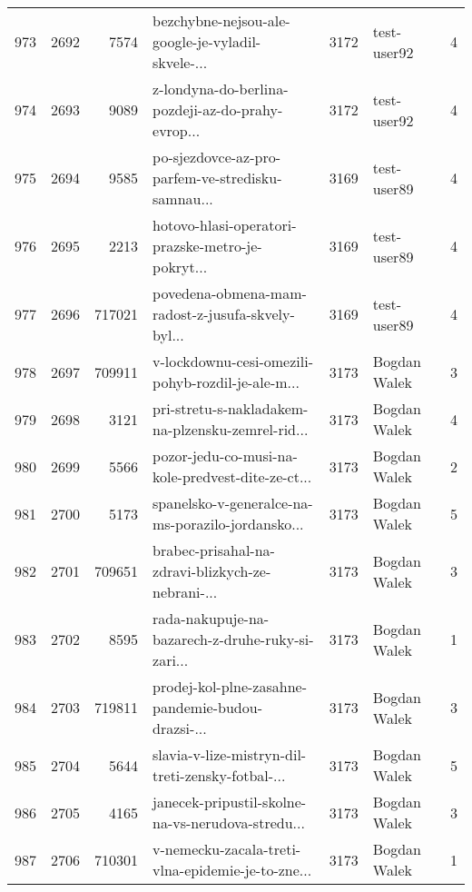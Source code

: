 \begin{tabular}{lrrlrlr}
973  &       2692 &     7574 &  bezchybne-nejsou-ale-google-je-vyladil-skvele-... &     3172 &                  test-user92 &               4 \\
974  &       2693 &     9089 &  z-londyna-do-berlina-pozdeji-az-do-prahy-evrop... &     3172 &                  test-user92 &               4 \\
975  &       2694 &     9585 &  po-sjezdovce-az-pro-parfem-ve-stredisku-samnau... &     3169 &                  test-user89 &               4 \\
976  &       2695 &     2213 &  hotovo-hlasi-operatori-prazske-metro-je-pokryt... &     3169 &                  test-user89 &               4 \\
977  &       2696 &   717021 &  povedena-obmena-mam-radost-z-jusufa-skvely-byl... &     3169 &                  test-user89 &               4 \\
978  &       2697 &   709911 &  v-lockdownu-cesi-omezili-pohyb-rozdil-je-ale-m... &     3173 &                 Bogdan Walek &               3 \\
979  &       2698 &     3121 &  pri-stretu-s-nakladakem-na-plzensku-zemrel-rid... &     3173 &                 Bogdan Walek &               4 \\
980  &       2699 &     5566 &  pozor-jedu-co-musi-na-kole-predvest-dite-ze-ct... &     3173 &                 Bogdan Walek &               2 \\
981  &       2700 &     5173 &  spanelsko-v-generalce-na-ms-porazilo-jordansko... &     3173 &                 Bogdan Walek &               5 \\
982  &       2701 &   709651 &  brabec-prisahal-na-zdravi-blizkych-ze-nebrani-... &     3173 &                 Bogdan Walek &               3 \\
983  &       2702 &     8595 &  rada-nakupuje-na-bazarech-z-druhe-ruky-si-zari... &     3173 &                 Bogdan Walek &               1 \\
984  &       2703 &   719811 &  prodej-kol-plne-zasahne-pandemie-budou-drazsi-... &     3173 &                 Bogdan Walek &               3 \\
985  &       2704 &     5644 &  slavia-v-lize-mistryn-dil-treti-zensky-fotbal-... &     3173 &                 Bogdan Walek &               5 \\
986  &       2705 &     4165 &  janecek-pripustil-skolne-na-vs-nerudova-stredu... &     3173 &                 Bogdan Walek &               3 \\
987  &       2706 &   710301 &  v-nemecku-zacala-treti-vlna-epidemie-je-to-zne... &     3173 &                 Bogdan Walek &               1 \\

\end{tabular}
